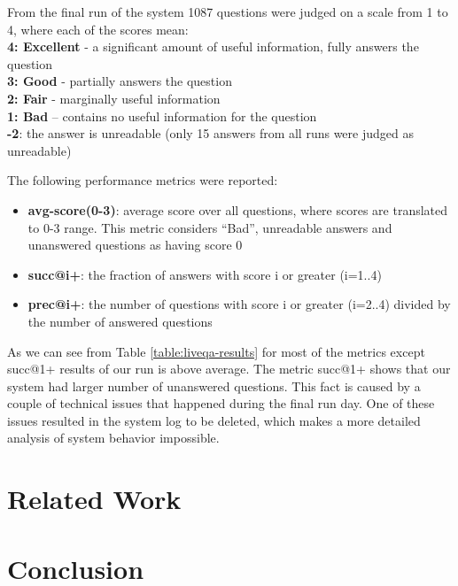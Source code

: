 \documentclass[]{article}
\begin{document}
From the final run of the system 1087 questions were judged on a scale from 1 to 4, where each of the scores mean:\\
\textbf{4: Excellent} - a significant amount of useful information, fully answers the question\\
\textbf{3: Good} - partially answers the question\\
\textbf{2: Fair} - marginally useful information\\
\textbf{1: Bad} – contains no useful information for the question\\
\textbf{-2}: the answer is unreadable  (only 15 answers from all runs were judged as unreadable)

The following performance metrics were reported:
\begin{itemize}
\setlength\itemsep{0mm}
\item \textbf{avg-score(0-3)}: average score over all questions, where scores are translated to 0-3 range. This metric considers ``Bad'', unreadable answers and unanswered questions as having score 0
\item \textbf{succ@i+}: the fraction of answers with score i or greater (i=1..4)
\item \textbf{prec@i+}: the number of questions with score i or greater (i=2..4) divided by the number of answered questions
\end{itemize}

As we can see from Table \ref{table:liveqa-results} for most of the metrics except succ@1+ results of our run is above average.
The metric succ@1+ shows that our system had larger number of unanswered questions.
This fact is caused by a couple of technical issues that happened during the final run day.
One of these issues resulted in the system log to be deleted, which makes a more detailed analysis of system behavior impossible.



\section{Related Work}

\section{Conclusion}



\end{document}
